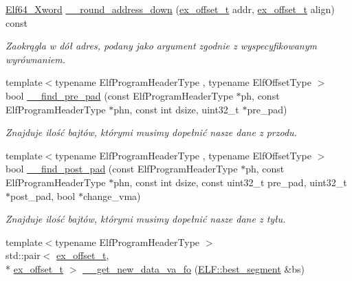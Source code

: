 \begin{DoxyCompactItemize}
\hyperlink{elf_8h_a5447a48a3dae0bd24f606415268c6fe4}{Elf64\-\_\-\-Xword} \hyperlink{class_e_l_f_a6f21db1a5111b80cadeb2b4892f8721b}{\-\_\-\-\_\-round\-\_\-address\-\_\-down} (\hyperlink{elffile_8h_aa2125ab7570efd47d79e62488cfe0207}{ex\-\_\-offset\-\_\-t} addr, \hyperlink{elffile_8h_aa2125ab7570efd47d79e62488cfe0207}{ex\-\_\-offset\-\_\-t} align) const 
\begin{DoxyCompactList}\small\item\em Zaokrągla w dół adres, podany jako argument zgodnie z wyspecyfikowanym wyrównaniem. \end{DoxyCompactList}\item 
{\footnotesize template$<$typename Elf\-Program\-Header\-Type , typename Elf\-Offset\-Type $>$ }\\bool \hyperlink{class_e_l_f_af0ab53eca3120e572be14e7cbd93d58e}{\-\_\-\-\_\-find\-\_\-pre\-\_\-pad} (const Elf\-Program\-Header\-Type $\ast$ph, const Elf\-Program\-Header\-Type $\ast$phn, const int dsize, uint32\-\_\-t $\ast$pre\-\_\-pad)
\begin{DoxyCompactList}\small\item\em Znajduje ilość bajtów, którymi musimy dopełnić nasze dane z przodu. \end{DoxyCompactList}\item 
{\footnotesize template$<$typename Elf\-Program\-Header\-Type , typename Elf\-Offset\-Type $>$ }\\bool \hyperlink{class_e_l_f_a0a97963a6c22ce291e355bd2593c6ab1}{\-\_\-\-\_\-find\-\_\-post\-\_\-pad} (const Elf\-Program\-Header\-Type $\ast$ph, const Elf\-Program\-Header\-Type $\ast$phn, const int dsize, const uint32\-\_\-t pre\-\_\-pad, uint32\-\_\-t $\ast$post\-\_\-pad, bool $\ast$change\-\_\-vma)
\begin{DoxyCompactList}\small\item\em Znajduje ilość bajtów, którymi musimy dopełnić nasze dane z tyłu. \end{DoxyCompactList}\item 
{\footnotesize template$<$typename Elf\-Program\-Header\-Type $>$ }\\std\-::pair$<$ \hyperlink{elffile_8h_aa2125ab7570efd47d79e62488cfe0207}{ex\-\_\-offset\-\_\-t}, \\*
\hyperlink{elffile_8h_aa2125ab7570efd47d79e62488cfe0207}{ex\-\_\-offset\-\_\-t} $>$ \hyperlink{class_e_l_f_ab54763d908ffbd053727e0490a3ce462}{\-\_\-\-\_\-get\-\_\-new\-\_\-data\-\_\-va\-\_\-fo} (\hyperlink{class_e_l_f_acc32d4569fb28ff6c041c20870d8c2e7}{E\-L\-F\-::best\-\_\-segment} \&bs)

\end{DoxyCompactItemize}
